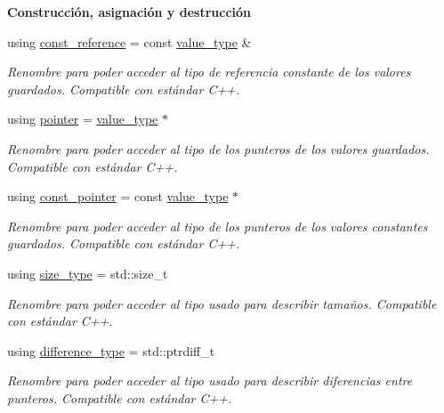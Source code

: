 \begin{Indent}{\bf \-Construcción, asignación y destrucción}
\begin{DoxyCompactItemize}
using \hyperlink{classaed2_1_1iterator_a84dc2693b11216f8c641b5df59088283_a84dc2693b11216f8c641b5df59088283}{const\+\_\+reference} = const \hyperlink{classaed2_1_1iterator_a6411a2c08b2b7c52f063bef1a168acb6_a6411a2c08b2b7c52f063bef1a168acb6}{value\+\_\+type} \&
\begin{DoxyCompactList}\small\item\em Renombre para poder acceder al tipo de referencia constante de los valores guardados. Compatible con estándar C++. \end{DoxyCompactList}\item 
using \hyperlink{classaed2_1_1iterator_a07466e8d020a80e2deb80364f28d4fa0_a07466e8d020a80e2deb80364f28d4fa0}{pointer} = \hyperlink{classaed2_1_1iterator_a6411a2c08b2b7c52f063bef1a168acb6_a6411a2c08b2b7c52f063bef1a168acb6}{value\+\_\+type} $\ast$
\begin{DoxyCompactList}\small\item\em Renombre para poder acceder al tipo de los punteros de los valores guardados. Compatible con estándar C++. \end{DoxyCompactList}\item 
using \hyperlink{classaed2_1_1iterator_afa70c9577ce04d4d7b84741fababc5ac_afa70c9577ce04d4d7b84741fababc5ac}{const\+\_\+pointer} = const \hyperlink{classaed2_1_1iterator_a6411a2c08b2b7c52f063bef1a168acb6_a6411a2c08b2b7c52f063bef1a168acb6}{value\+\_\+type} $\ast$
\begin{DoxyCompactList}\small\item\em Renombre para poder acceder al tipo de los punteros de los valores constantes guardados. Compatible con estándar C++. \end{DoxyCompactList}\item 
using \hyperlink{classaed2_1_1iterator_a0d460d3f76439cea3436e1113990be47_a0d460d3f76439cea3436e1113990be47}{size\+\_\+type} = std\+::size\+\_\+t
\begin{DoxyCompactList}\small\item\em Renombre para poder acceder al tipo usado para describir tamaños. Compatible con estándar C++. \end{DoxyCompactList}\item 
using \hyperlink{classaed2_1_1iterator_a552af1cab9391f5af6bb86d457031329_a552af1cab9391f5af6bb86d457031329}{difference\+\_\+type} = std\+::ptrdiff\+\_\+t
\begin{DoxyCompactList}\small\item\em Renombre para poder acceder al tipo usado para describir diferencias entre punteros. Compatible con estándar C++. \end{DoxyCompactList}\item 

\end{DoxyCompactItemize}
\end{Indent}
